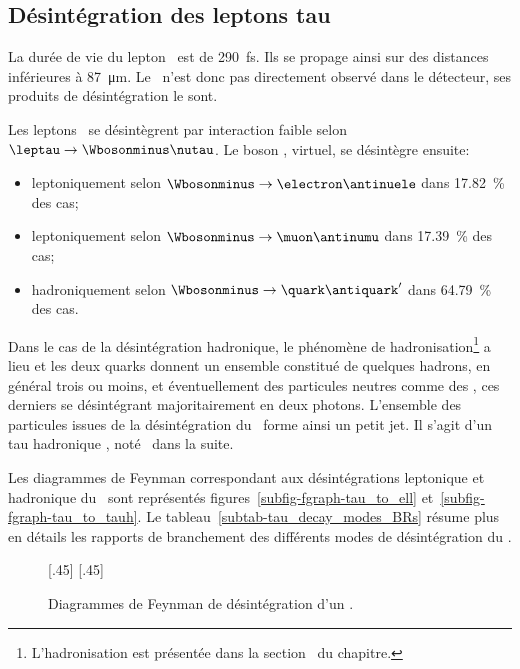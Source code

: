 \subsection{Désintégration des leptons tau}\label{chapter-MS-MSSM-section-pheno_Higgs_MSSM-subsec-desintegration_lepton_tau}
La durée de vie du lepton \tau\ est de \SI{290}{\femto\second}. Ils se propage ainsi sur des distances inférieures à \SI{87}{\micro\meter}.
Le \tau\ n'est donc pas directement observé dans le détecteur, ses produits de désintégration le sont.
\par Les leptons \tau\ se désintègrent par interaction faible selon $\leptau\to\Wbosonminus\nutau$.
Le boson \Wboson, virtuel, se désintègre ensuite:
\begin{itemize}
\item leptoniquement selon $\Wbosonminus\to\electron\antinuele$ dans \SI{17.82}{\%} des cas;
\item leptoniquement selon $\Wbosonminus\to\muon\antinumu$ dans \SI{17.39}{\%} des cas;
\item hadroniquement selon $\Wbosonminus\to\quark\antiquark'$ dans \SI{64.79}{\%} des cas.
\end{itemize}
\par Dans le cas de la désintégration hadronique, le phénomène de hadronisation\footnote{L'hadronisation est présentée dans la section~ du chapitre.} a lieu et les deux quarks donnent un ensemble constitué de quelques hadrons, en général trois ou moins, et éventuellement des particules neutres comme des \pionnull, ces derniers se désintégrant majoritairement en deux photons.
L'ensemble des particules issues de la désintégration du \Wboson\ forme ainsi un petit jet.
Il s'agit d'un \og tau hadronique \fg, noté \tauh\ dans la suite.
\par Les diagrammes de Feynman correspondant aux désintégrations leptonique et hadronique du \tau\ sont représentés figures~\ref{subfig-fgraph-tau_to_ell} et~\ref{subfig-fgraph-tau_to_tauh}.
Le tableau~\ref{subtab-tau_decay_modes_BRs} résume plus en détails les rapports de branchement des différents modes de désintégration du \tau.
\begin{figure}[h]
\centering
\vspace{\baselineskip}
[.45\textwidth]
{\vspace{\baselineskip}}
\hfill
{}[.45\textwidth]
{\vspace{\baselineskip}}
\caption{Diagrammes de Feynman de désintégration d'un \leptau.}
\label{fig-fgraph-tau_to_ell_and_tauh}
\end{figure}
